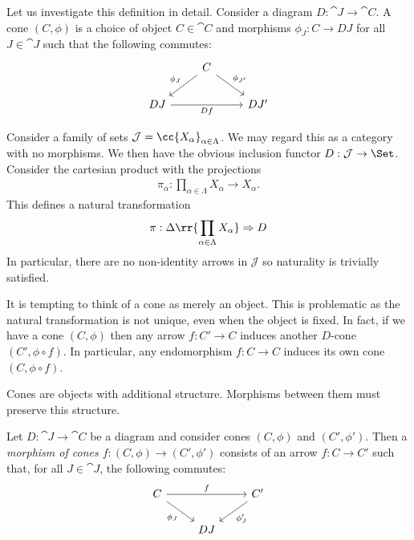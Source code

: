 \documentclass{article}
\begin{document}
Let us investigate this definition in detail. Consider a diagram
$D:\cat{J}\to\cat{C}$. A cone $(C,\phi)$ is a choice of object $C\in\cat{C}$
and morphisms $\phi_J:C\to DJ$ for all $J\in\cat{J}$ such that the following
commutes:
\begin{equation}
  \begin{tikzcd}
  & C \\
    DJ && {DJ'}
    \arrow["Df"', from=2-1, to=2-3]
    \arrow["{\phi_{J'}}", from=1-2, to=2-3]
    \arrow["{\phi_J}"', from=1-2, to=2-1]
  \end{tikzcd}
\end{equation}

\begin{example}
  Consider a family of sets $\mathcal J=\cc{X_\alpha}_{\alpha\in\Lambda}$. We may
  regard this as a category with no morphisms. We then have
  the obvious inclusion functor $D:\mathcal J\to\Set$. Consider the cartesian
  product with the projections
  \begin{align*}
    \pi_\alpha : \prod_{\alpha\in\Lambda} X_\alpha \to X_\alpha.
  \end{align*}
  This defines a natural transformation
  \begin{align*}
    \pi : \Delta\rr{\prod_{\alpha\in\Lambda} X_\alpha}\Rightarrow D
  \end{align*}
  In particular, there are no non-identity arrows in $\mathcal J$ so
  naturality is trivially satisfied.
\end{example}

It is tempting to think of a cone as merely an object. This is problematic as
the natural transformation is not unique, even when the object is fixed. In
fact, if we have a cone $(C,\phi)$ then any arrow $f:C'\to C$ induces another
$D$-cone $(C',\phi\circ f)$. In particular, any endomorphism $f:C\to C$ induces
its own cone $(C,\phi\circ f)$.


Cones are objects with additional structure. Morphisms between them must preserve
this structure.

\begin{definition}
  Let $D:\cat{J}\to\cat{C}$ be a diagram and consider cones $(C,\phi)$ and
  $(C',\phi')$. Then a \emph{morphism of cones $f:(C,\phi)\to(C',\phi')$} consists of
  an arrow $f:C\to C'$ such that, for all $J\in\cat{J}$, the following
  commutes:
  \begin{equation}
    \begin{tikzcd}
      C && {C'} \\
        & DJ
        \arrow["f", from=1-1, to=1-3]
        \arrow["{\phi_J'}", from=1-3, to=2-2]
        \arrow["{\phi_J}"', from=1-1, to=2-2]
    \end{tikzcd}
  \end{equation}
\end{definition}
\end{document}
